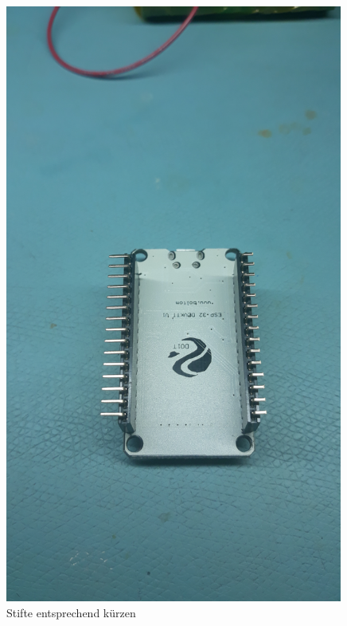 \documentclass[12pt, a4paper]{article}		%
\begin{document}
\begin{figure}[H]
	\centering
		\includegraphics[width=0.99\textwidth]{Grafiken/20200726_213655.jpg}
	\caption{Stifte entsprechend kürzen}
	\label{fig:20200726_213655}
\end{figure}
\end{document}
